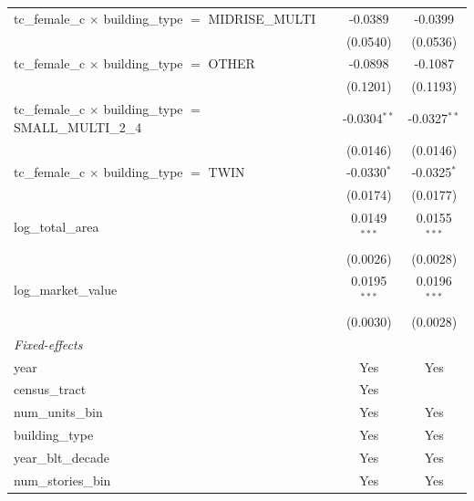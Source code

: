 \begin{tabular}{lcc}
   tc\_female\_c $\times$ building\_type $=$ MIDRISE\_MULTI            & -0.0389        & -0.0399\\   
                                                                       & (0.0540)       & (0.0536)\\   
   tc\_female\_c $\times$ building\_type $=$ OTHER                     & -0.0898        & -0.1087\\   
                                                                       & (0.1201)       & (0.1193)\\   
   tc\_female\_c $\times$ building\_type $=$ SMALL\_MULTI\_2\_4        & -0.0304$^{**}$ & -0.0327$^{**}$\\   
                                                                       & (0.0146)       & (0.0146)\\   
   tc\_female\_c $\times$ building\_type $=$ TWIN                      & -0.0330$^{*}$  & -0.0325$^{*}$\\   
                                                                       & (0.0174)       & (0.0177)\\   
   log\_total\_area                                                    & 0.0149$^{***}$ & 0.0155$^{***}$\\   
                                                                       & (0.0026)       & (0.0028)\\   
   log\_market\_value                                                  & 0.0195$^{***}$ & 0.0196$^{***}$\\   
                                                                       & (0.0030)       & (0.0028)\\   
   \midrule
   \emph{Fixed-effects}\\
   year                                                                & Yes            & Yes\\  
   census\_tract                                                       & Yes            & \\  
   num\_units\_bin                                                     & Yes            & Yes\\  
   building\_type                                                      & Yes            & Yes\\  
   year\_blt\_decade                                                   & Yes            & Yes\\  
   num\_stories\_bin                                                   & Yes            & Yes\\  

\end{tabular}
